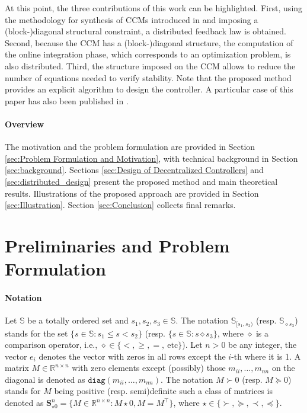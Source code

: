 \documentclass[10pt,twocolumn,twoside]{IEEEtran}
\newcounter{para}
\newcommand\mypara{\par}
\theoremstyle{plain}
\theoremstyle{definition}
\theoremstyle{remark}
\begin{document}


\mypara At this point, the three contributions of this work can be highlighted. First, using the methodology for synthesis of CCMs introduced in \cite{manchester_control_2017} and imposing a (block-)diagonal structural constraint, a distributed feedback law is obtained. Second, because the CCM has a (block-)diagonal structure, the computation of the online integration phase, which corresponds to an optimization problem, is also distributed. Third, the structure imposed on the CCM allows to reduce the number of equations needed to  verify stability. Note that the proposed method provides an explicit algorithm to design the controller. A particular case of this paper has also been published in \cite{SteinShiromotoManchester2016}.

\paragraph{Overview} The motivation and the problem formulation are provided in Section \ref{sec:Problem Formulation and Motivation}, with technical background in Section \ref{sec:background}. Sections \ref{sec:Design of Decentralized Controllers} and \ref{sec:distributed_design} present the proposed method and main theoretical results. Illustrations of the proposed approach are provided in Section \ref{sec:Illustration}. Section \ref{sec:Conclusion} collects final remarks.

\section{Preliminaries and Problem Formulation}

\paragraph{Notation} Let $\mathbb{S}$ be a totally ordered set and $s_1,s_2,s_3\in\mathbb{S}$. The notation $\mathbb{S}_{[s_1,s_2)}$ (resp. $\mathbb{S}_{\diamond s_3}$) stands for the set $\{s\in\mathbb{S}:s_1\leq s< s_2\}$ (resp. $\{s\in\mathbb{S}:s\diamond s_3\}$, where $\diamond$ is a comparison operator, i.e., $\diamond\in\{<,\geq,=,\ \text{etc}\}$). Let $n>0$ be any integer, the vector $e_i$ denotes the vector with zeros in all rows except the $i$-th where it is 1. A matrix $M\in\mathbb{R}^{n\times n}$ with zero elements except (possibly) those  $m_{ii},\ldots,m_{nn}$ on the diagonal is denoted as $\mathbin{\mathtt{diag}}(m_{ii},\ldots,m_{nn})$. The notation $M\succ 0$ (resp. $M\succeq 0$) stands for $M$ being positive (resp. semi)definite such a class of matrices is denoted as $\mathbf{S}_{\star0}^n=\{M\in\mathbb{R}^{n\times n}:M\star0,M=M^\top\}$, where $\star\in\{\succ,\succeq,\prec,\preceq\}$. 
\end{document}

